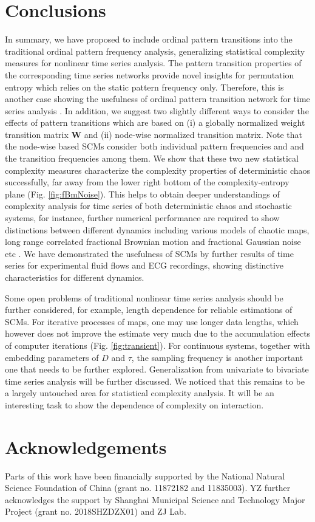 \documentclass[12pt,aip,cha,reprint,nofootinbib]{revtex4-1}
\begin{document}
\section{Conclusions} \label{sec:con}
In summary, we have proposed to include ordinal pattern transitions into the traditional ordinal pattern frequency analysis, generalizing statistical complexity measures for nonlinear time series analysis. The pattern transition properties of the corresponding time series networks provide novel insights for permutation entropy which relies on the static pattern frequency only. Therefore, this is another case showing the usefulness of ordinal pattern transition network for time series analysis \cite{ZouPR2018}. In addition, we suggest two slightly different ways to consider the effects of pattern transitions which are based on (i) a globally normalized weight transition matrix $\mathbf{W}$ and (ii) node-wise normalized transition matrix. Note that the node-wise based SCMs consider both individual pattern frequencies and and the transition frequencies among them. We show that these two new statistical complexity measures characterize the complexity properties of deterministic chaos successfully, far away from the lower right bottom of the complexity-entropy plane (Fig. \ref{fig:fBmNoise}). This helps to obtain deeper understandings of complexity analysis for time series of both deterministic chaos and stochastic systems, for instance, further numerical performance are required to show distinctions between different dynamics including various models of chaotic maps, long range correlated fractional Brownian motion and fractional Gaussian noise etc \cite{BorgesAMC2019,RossoPRE2007}. We have demonstrated the usefulness of SCMs by further results of time series for experimental fluid flows and ECG recordings, showing distinctive characteristics for different dynamics. 

Some open problems of traditional nonlinear time series analysis should be further considered, for example, length dependence for reliable estimations of SCMs. For iterative processes of maps, one may use longer data lengths, which however does not improve the estimate very much due to the accumulation effects of computer iterations (Fig. \ref{fig:transient}). For continuous systems, together with embedding parameters of $D$ and $\tau$, the sampling frequency is another important one that needs to be further explored. Generalization from univariate to bivariate time series analysis will be further discussed. We noticed that this remains to be a largely untouched area for statistical complexity analysis. It will be an interesting task to show the dependence of complexity on interaction. 

\section*{Acknowledgements}
Parts of this work have been financially supported by the National Natural Science Foundation of China (grant no. 11872182 and 11835003). YZ further acknowledges the support by Shanghai Municipal Science and Technology Major Project (grant no. 2018SHZDZX01) and ZJ Lab. 



\end{document}
